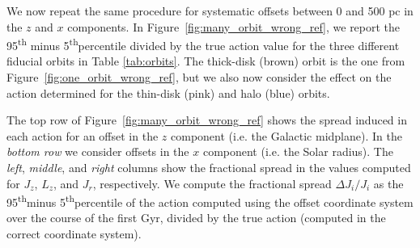 \documentclass[twocolumn]{aastex62}
\newcommand{\pc}{\text{pc}}
\newcommand{\Gyr}{\text{Gyr}}
\newcommand{\kms}{\text{km}/\text{s}}
\newcommand{\actunit}{\text{kpc}\,\kms}
\newcommand{\uth}{\textsuperscript{th}}
\newcommand{\thincolor}{pink}
\newcommand{\thickcolor}{brown}
\newcommand{\halocolor}{blue}
\begin{document}
\begin{figure*}
\caption{The artificial phase-dependence in the observed actions induced by an
error in the Galactocentric coordinate system. We consider here the thick disk
orbit, which has actions of $(J_r, L_z, J_z) = (37.9, -1520, 7.0)\,\actunit$
and $z_{\text{max}}=850\,\pc$ (see Table~\ref{tab:orbits}). We integrate the
orbit according to the procedure laid out in Section~\ref{ssec:action_comp}.
Then, we subtract $100\,\pc$ from the $z$ value ({\em upper panels}) or the
$x$ value ({\em lower panels}) of each position in the orbit, corresponding to
an erroneous observer assuming a midplane ({\em upper}) or solar radius ({\em
lower}) that is off by $100\,\pc$. We then allow our (immortal) observer to
observe the orbit over $1\,\Gyr$ and perform the same orbit integration
procedure at each timestep, and report the values of the actions. The
computation of $L_z$ is pristine to errors in $z$, with only numerical
artifacts remaining. Only small errors are induced in $J_r$, with the middle
$90\%$ of values over the $\Gyr$ being within $\sim8\%$ of the true $J_r$. As
expected, large errors are induced in $J_z$ with a $100\,\pc$ offset in $z$,
with the middle $90\%$ of values being within $\sim43\%$ of the true $J_z$. The $x$
offset induces uncertainties in $J_r$ and $L_z$ of $\sim21\%$ and $\sim3\%$,
respectively. A $\sim3\%$ error in $J_z$ is also induced.}
\label{fig:one_orbit_wrong_ref}
\end{figure*}

We now repeat the same procedure for systematic offsets between 0 and 500 pc in the $z$ and
$x$ components. In Figure~\ref{fig:many_orbit_wrong_ref}, we report the 95\uth
minus 5\uth percentile divided by the true action value for the three different fiducial
orbits in Table \ref{tab:orbits}. The thick-disk (\thickcolor) orbit is the one from
Figure~\ref{fig:one_orbit_wrong_ref}, but we also now consider the effect on the action determined for the thin-disk (\thincolor) and halo (\halocolor) orbits.

The top row of Figure~\ref{fig:many_orbit_wrong_ref} shows the spread induced in each
action for an offset in the $z$ component (i.e. the Galactic midplane).
In the {\em bottom row} we consider offsets in the $x$ component (i.e.
the Solar radius). The {\em left}, {\em middle}, and {\em right} columns show
the fractional spread in the values computed for $J_z$, $L_z$, and $J_r$, respectively. We compute the
fractional spread $\Delta J_i/J_i$ as the 95\uth minus 5\uth percentile of the action computed using the 
offset coordinate system over the course of the first $\Gyr$, divided by the true action (computed in the correct coordinate system).
\end{document}
